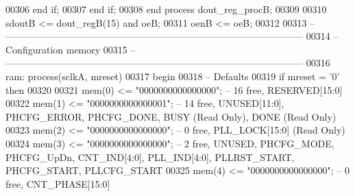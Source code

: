 \begin{DoxyCode}
00306       \textcolor{keywordflow}{end} \textcolor{keywordflow}{if};      
00307    \textcolor{keywordflow}{end} \textcolor{keywordflow}{if};
00308 \textcolor{keywordflow}{end} \textcolor{keywordflow}{process} \textcolor{vhdlchar}{dout\_reg\_procB};
00309 
00310 \textcolor{vhdlchar}{sdoutB}   \textcolor{vhdlchar}{<=} \textcolor{vhdlchar}{dout_regB}\textcolor{vhdlchar}{(}\textcolor{vhdllogic}{}\textcolor{vhdllogic}{15}\textcolor{vhdlchar}{)} \textcolor{keywordflow}{and} \textcolor{vhdlchar}{oeB};
00311 \textcolor{vhdlchar}{oenB}     \textcolor{vhdlchar}{<=} \textcolor{vhdlchar}{oeB};
00312 
00313 \textcolor{keyword}{-- ---------------------------------------------------------------------------------------------}
00314 \textcolor{keyword}{-- Configuration memory}
00315 \textcolor{keyword}{-- --------------------------------------------------------------------------------------------- }
00316 ram: \textcolor{keywordflow}{process}(sclkA, mreset)
00317 \textcolor{vhdlkeyword}{begin}
00318 \textcolor{keyword}{-- Defaults}
00319    \textcolor{keywordflow}{if} \textcolor{vhdlchar}{mreset} \textcolor{vhdlchar}{=} \textcolor{vhdlchar}{'}\textcolor{vhdllogic}{}\textcolor{vhdllogic}{0}\textcolor{vhdlchar}{'} \textcolor{keywordflow}{then}
00320 
00321       \textcolor{vhdlchar}{mem}\textcolor{vhdlchar}{(}\textcolor{vhdllogic}{}\textcolor{vhdllogic}{0}\textcolor{vhdlchar}{)}   \textcolor{vhdlchar}{<=} \textcolor{vhdllogic}{"0000000000000000"};\textcolor{keyword}{ -- 16 free, RESERVED[15:0]}
00322       \textcolor{vhdlchar}{mem}\textcolor{vhdlchar}{(}\textcolor{vhdllogic}{}\textcolor{vhdllogic}{1}\textcolor{vhdlchar}{)}   \textcolor{vhdlchar}{<=} \textcolor{vhdllogic}{"0000000000000001"};\textcolor{keyword}{ -- 14 free, UNUSED[11:0], PHCFG\_ERROR, PHCFG\_DONE, BUSY (Read Only),
       DONE (Read Only)}
00323       \textcolor{vhdlchar}{mem}\textcolor{vhdlchar}{(}\textcolor{vhdllogic}{}\textcolor{vhdllogic}{2}\textcolor{vhdlchar}{)}   \textcolor{vhdlchar}{<=} \textcolor{vhdllogic}{"0000000000000000"};\textcolor{keyword}{ -- 0  free, PLL\_LOCK[15:0] (Read Only)}
00324       \textcolor{vhdlchar}{mem}\textcolor{vhdlchar}{(}\textcolor{vhdllogic}{}\textcolor{vhdllogic}{3}\textcolor{vhdlchar}{)}   \textcolor{vhdlchar}{<=} \textcolor{vhdllogic}{"0000000000000000"};\textcolor{keyword}{ -- 2  free, UNUSED, PHCFG\_MODE, PHCFG\_UpDn, CNT\_IND[4:0],
       PLL\_IND[4:0], PLLRST\_START, PHCFG\_START, PLLCFG\_START}
00325       \textcolor{vhdlchar}{mem}\textcolor{vhdlchar}{(}\textcolor{vhdllogic}{}\textcolor{vhdllogic}{4}\textcolor{vhdlchar}{)}   \textcolor{vhdlchar}{<=} \textcolor{vhdllogic}{"0000000000000000"};\textcolor{keyword}{ -- 0  free, CNT\_PHASE[15:0]}

\end{DoxyCode}
